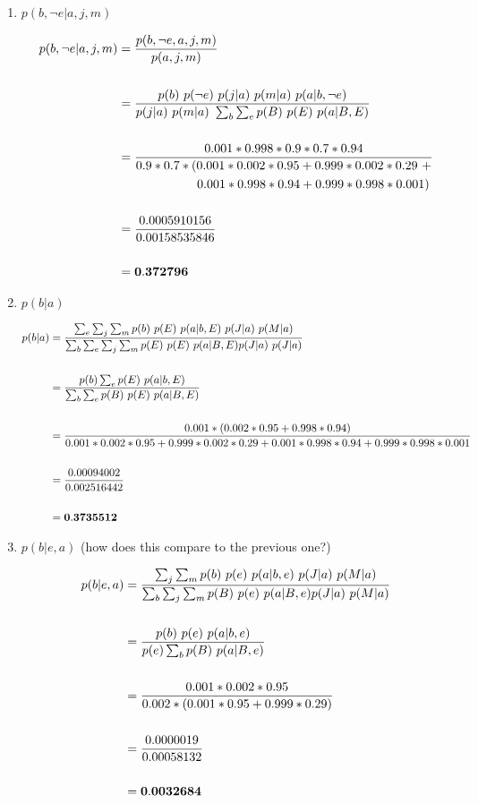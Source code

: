 \documentclass[fleqn]{hw}
\begin{document}
\begin{enumerate}
\item $p(b, \lnot e | a, j, m)$

\begin{align*}
p(b, \lnot e | a, j, m) &= \frac{p(b, \lnot e, a, j, m)}{p(a, j, m)} \\ \\
&= \frac{p(b) \ p(\lnot e) \ p(j | a) \ p(m | a) \ p(a | b, \lnot e)}{p(j | a) \ p(m | a) \ \sum_{b} \sum_{e} p(B) \ p(E) \ p(a | B, E)} \\ \\
&= \frac{0.001 * 0.998 * 0.9 * 0.7 * 0.94}{0.9 * 0.7 * (0.001 * 0.002 * 0.95 + 0.999 * 0.002 * 0.29 \ + } \\
&\qquad\qquad\qquad \ 0.001 * 0.998 * 0.94 + 0.999 * 0.998 * 0.001) \\ \\
&= \frac{0.0005910156}{0.00158535846} \\ \\
&= {\bf 0.372796}
\end{align*}

\item $p(b | a)$

\begin{align*}
p(b|a) &= \frac{\sum_{e} \sum_{j} \sum_{m} p(b) \ p(E) \ p(a | b, E) \ p(J | a) \ p(M | a)}{\sum_{b} \sum_{e} \sum_{j} \sum_{m} p(E) \ p(E) \ p(a | B, E) p(J | a) \ p(J | a)} \\ \\
&= \frac{p(b) \sum_{e} p(E) \ p(a | b, E)}{\sum_{b} \sum_{e} p(B) \ p(E) \ p(a|B, E)} \\ \\
&= \frac{0.001 * (0.002 * 0.95 + 0.998 * 0.94)}{0.001 * 0.002 * 0.95 + 0.999 * 0.002 * 0.29 + 0.001 * 0.998 * 0.94 + 0.999 * 0.998 * 0.001} \\ \\
&= \frac{0.00094002}{0.002516442} \\ \\
&= {\bf 0.3735512}
\end{align*}

\newpage
\item $p(b | e,a)$  (how does this compare to the previous one?)

\begin{align*}
p(b | e, a) & = \frac{\sum_{j} \sum_{m} p(b) \ p(e) \ p(a | b, e) \ p(J | a) \ p(M | a)}{\sum_{b} \sum_{j} \sum_{m} p(B) \ p(e) \ p(a | B, e) p(J | a) \ p(M | a)} \\ \\ 
&= 	\frac{p(b) \ p(e) \ p(a | b, e)}{p(e) \sum_{b} p(B) \ p(a|B, e)} \\ \\
&= \frac{0.001 * 0.002 * 0.95}{0.002 * (0.001 * 0.95 + 0.999 * 0.29)} \\ \\
&= \frac{0.0000019}{0.00058132} \\ \\ 
&= {\bf 0.0032684}
\end{align*}


\end{enumerate}
\end{document}
